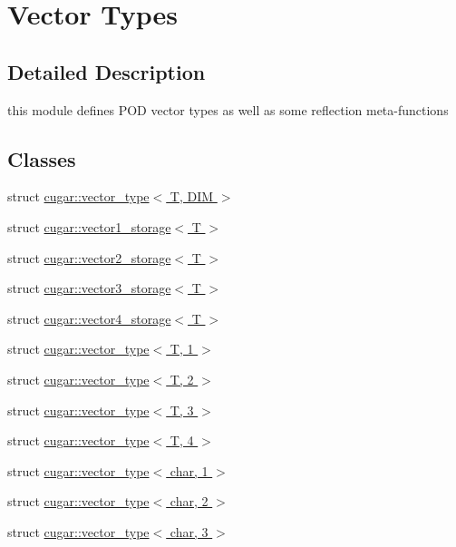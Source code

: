 \hypertarget{group___vector_types_module}{}\section{Vector Types}
\label{group___vector_types_module}


\subsection{Detailed Description}
this module defines P\+OD vector types as well as some reflection meta-\/functions \subsection*{Classes}
\begin{DoxyCompactItemize}
\item 
struct \hyperlink{structcugar_1_1vector__type}{cugar\+::vector\+\_\+type$<$ T, D\+I\+M $>$}
\item 
struct \hyperlink{structcugar_1_1vector1__storage}{cugar\+::vector1\+\_\+storage$<$ T $>$}
\item 
struct \hyperlink{structcugar_1_1vector2__storage}{cugar\+::vector2\+\_\+storage$<$ T $>$}
\item 
struct \hyperlink{structcugar_1_1vector3__storage}{cugar\+::vector3\+\_\+storage$<$ T $>$}
\item 
struct \hyperlink{structcugar_1_1vector4__storage}{cugar\+::vector4\+\_\+storage$<$ T $>$}
\item 
struct \hyperlink{structcugar_1_1vector__type_3_01_t_00_011_01_4}{cugar\+::vector\+\_\+type$<$ T, 1 $>$}
\item 
struct \hyperlink{structcugar_1_1vector__type_3_01_t_00_012_01_4}{cugar\+::vector\+\_\+type$<$ T, 2 $>$}
\item 
struct \hyperlink{structcugar_1_1vector__type_3_01_t_00_013_01_4}{cugar\+::vector\+\_\+type$<$ T, 3 $>$}
\item 
struct \hyperlink{structcugar_1_1vector__type_3_01_t_00_014_01_4}{cugar\+::vector\+\_\+type$<$ T, 4 $>$}
\item 
struct \hyperlink{structcugar_1_1vector__type_3_01char_00_011_01_4}{cugar\+::vector\+\_\+type$<$ char, 1 $>$}
\item 
struct \hyperlink{structcugar_1_1vector__type_3_01char_00_012_01_4}{cugar\+::vector\+\_\+type$<$ char, 2 $>$}
\item 
struct \hyperlink{structcugar_1_1vector__type_3_01char_00_013_01_4}{cugar\+::vector\+\_\+type$<$ char, 3 $>$}

\end{DoxyCompactItemize}
